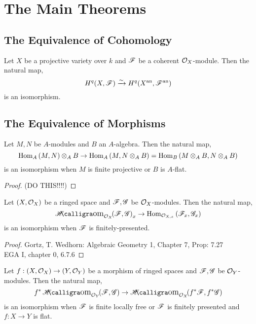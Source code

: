 \documentclass[12pt]{article}
\begin{document}
\section{The Main Theorems}

\subsection{The Equivalence of Cohomology}

\begin{theorem}
Let $X$ be a projective variety over $k$ and $\mathscr{F}$ be a coherent $\mathcal{O}_{X}$-module. Then the natural map,
\[ H^q(X, \mathscr{F}) \xrightarrow{\sim} H^q(X^{\mathrm{an}}, \mathscr{F}^{\mathrm{an}}) \]
is an isomorphism. 
\end{theorem}

\subsection{The Equivalence of Morphisms}

\begin{lemma}
Let $M, N$ be $A$-modules and $B$ an $A$-algebra. Then the natural map,
\[ \mathrm{Hom}_{A} \left( M, N \right) \otimes_A B \to \mathrm{Hom}_{A} \left( M, N \otimes_A B \right) = \mathrm{Hom}_{B} \left( M \otimes_A B, N \otimes_A B \right) \]
is an isomorphism when $M$ is finite projective or $B$ is $A$-flat. 
\end{lemma}

\begin{proof}
(DO THIS!!!!)
\end{proof}

\begin{lemma}
Let $(X, \mathcal{O}_{X})$ be a ringed space and $\mathscr{F}, \mathscr{G}$ be $\mathcal{O}_{X}$-modules. Then the natural map,
\[ \shHom{\struct{X}}{\F}{\G}_x \to \Hom{\stalk{X}{x}}{\F_x}{\G_x} \]
is an isomorphism when $\mathscr{F}$ is finitely-presented.
\end{lemma}

\begin{proof}
 Gortz, T. Wedhorn: Algebraic Geometry 1, Chapter 7, Prop: 7.27
 \\
 EGA I, chapter 0, 6.7.6 
\end{proof}

\begin{lemma}
Let $f : (X, \mathcal{O}_{X}) \to (Y, \mathcal{O}_{Y})$ be a morphism of ringed spaces and $\mathscr{F}, \mathscr{G}$ be $\mathcal{O}_{Y}$-modules. Then the natural map,
\[ f^* \shHom{\struct{Y}}{\F}{\G} \to \shHom{\struct{X}}{f^* \F}{f^* \G} \]
is an isomorphism when $\mathscr{F}$ is finite locally free or $\mathscr{F}$ is finitely presented and $f : X \to Y$ is flat.
\end{lemma}
\end{document}
